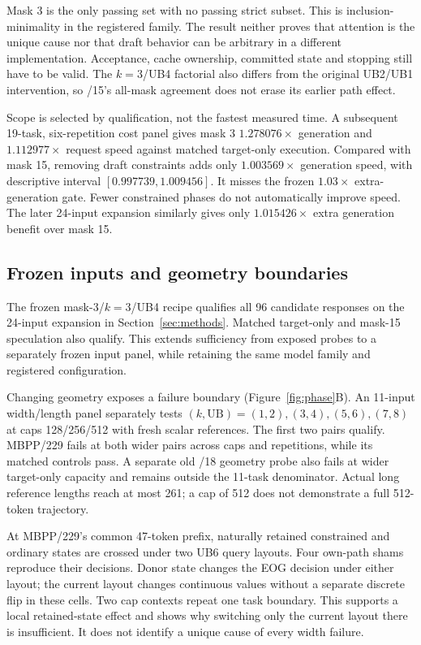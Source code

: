 Mask 3 is the only passing set with no passing strict subset. This is inclusion-minimality in the registered family. The result neither proves that attention is the unique cause nor that draft behavior can be arbitrary in a different implementation. Acceptance, cache ownership, committed state and stopping still have to be valid. The $k=3$/UB4 factorial also differs from the original UB2/UB1 intervention, so /15's all-mask agreement does not erase its earlier path effect.

Scope is selected by qualification, not the fastest measured time. A subsequent 19-task, six-repetition cost panel gives mask 3 $1.278076\times$ generation and $1.112977\times$ request speed against matched target-only execution. Compared with mask 15, removing draft constraints adds only $1.003569\times$ generation speed, with descriptive interval $[0.997739,1.009456]$. It misses the frozen $1.03\times$ extra-generation gate. Fewer constrained phases do not automatically improve speed. The later 24-input expansion similarly gives only $1.015426\times$ extra generation benefit over mask 15.

\subsection{Frozen inputs and geometry boundaries}
The frozen mask-3/$k=3$/UB4 recipe qualifies all 96 candidate responses on the 24-input expansion in Section~\ref{sec:methods}. Matched target-only and mask-15 speculation also qualify. This extends sufficiency from exposed probes to a separately frozen input panel, while retaining the same model family and registered configuration.

Changing geometry exposes a failure boundary (Figure~\ref{fig:phase}B). An 11-input width/length panel separately tests $(k,\mathrm{UB})=(1,2),(3,4),(5,6),(7,8)$ at caps 128/256/512 with fresh scalar references. The first two pairs qualify. MBPP/229 fails at both wider pairs across caps and repetitions, while its matched controls pass. A separate old /18 geometry probe also fails at wider target-only capacity and remains outside the 11-task denominator. Actual long reference lengths reach at most 261; a cap of 512 does not demonstrate a full 512-token trajectory.

At MBPP/229's common 47-token prefix, naturally retained constrained and ordinary states are crossed under two UB6 query layouts. Four own-path shams reproduce their decisions. Donor state changes the EOG decision under either layout; the current layout changes continuous values without a separate discrete flip in these cells. Two cap contexts repeat one task boundary. This supports a local retained-state effect and shows why switching only the current layout there is insufficient. It does not identify a unique cause of every width failure.

